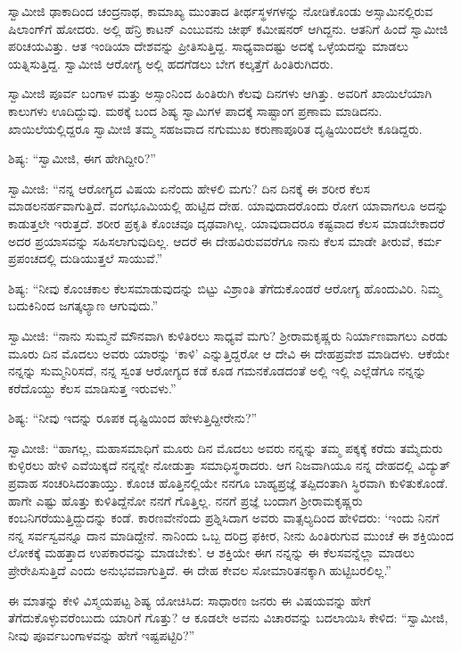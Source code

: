  ಸ್ವಾಮೀಜಿ ಢಾಕಾದಿಂದ ಚಂದ್ರನಾಥ, ಕಾಮಾಖ್ಯ ಮುಂತಾದ ತೀರ್ಥಸ್ಥಳಗಳನ್ನು ನೋಡಿಕೊಂಡು ಅಸ್ಸಾಮಿನಲ್ಲಿರುವ ಷಿಲಾಂಗ್‍ಗೆ ಹೋದರು. ಅಲ್ಲಿ ಹೆನ್ರಿ ಕಾಟನ್ ಎಂಬುವನು ಚೀಫ್ ಕಮೀಷನರ್ ಆಗಿದ್ದನು. ಆತನಿಗೆ ಹಿಂದೆ ಸ್ವಾಮೀಜಿ ಪರಿಚಯವಿತ್ತು. ಆತ ಇಂಡಿಯಾ ದೇಶವನ್ನು ಪ್ರೀತಿಸುತ್ತಿದ್ದ. ಸಾಧ್ಯವಾದಷ್ಟು ಅದಕ್ಕೆ ಒಳ್ಳೆಯದನ್ನು ಮಾಡಲು ಯತ್ನಿಸುತ್ತಿದ್ದ. ಸ್ವಾಮೀಜಿ ಆರೋಗ್ಯ ಅಲ್ಲಿ ಹದಗೆಡಲು ಬೇಗ ಕಲ್ಕತ್ತೆಗೆ ಹಿಂತಿರುಗಿದರು. 

 ಸ್ವಾಮೀಜಿ ಪೂರ್ವ ಬಂಗಾಳ ಮತ್ತು ಅಸ್ಸಾಂನಿಂದ ಹಿಂತಿರುಗಿ ಕೆಲವು ದಿನಗಳು ಆಗಿತ್ತು. ಅವರಿಗೆ ಖಾಯಿಲೆಯಾಗಿ ಕಾಲುಗಳು ಊದಿದ್ದುವು. ಮಠಕ್ಕೆ ಬಂದ ಶಿಷ್ಯ ಸ್ವಾಮಿಗಳ ಪಾದಕ್ಕೆ ಸಾಷ್ಟಾಂಗ ಪ್ರಣಾಮ ಮಾಡಿದನು. ಖಾಯಿಲೆಯಲ್ಲಿದ್ದರೂ ಸ್ವಾಮೀಜಿ ತಮ್ಮ ಸಹಜವಾದ ನಗುಮುಖ ಕರುಣಾಪೂರಿತ ದೃಷ್ಟಿಯಿಂದಲೇ ಕೂಡಿದ್ದರು. 

 ಶಿಷ್ಯ: “ಸ್ವಾಮೀಜಿ, ಈಗ ಹೇಗಿದ್ದೀರಿ?” 

 ಸ್ವಾಮೀಜಿ: “ನನ್ನ ಆರೋಗ್ಯದ ವಿಷಯ ಏನೆಂದು ಹೇಳಲಿ ಮಗು? ದಿನ ದಿನಕ್ಕೆ ಈ ಶರೀರ ಕೆಲಸ ಮಾಡಲನರ್ಹವಾಗುತ್ತಿದೆ. ವಂಗಭೂಮಿಯಲ್ಲಿ ಹುಟ್ಟಿದ ದೇಹ. ಯಾವುದಾದರೊಂದು ರೋಗ ಯಾವಾಗಲೂ ಅದನ್ನು ಕಾಡುತ್ತಲೇ ಇರುತ್ತದೆ. ಶರೀರ ಪ್ರಕೃತಿ ಕೊಂಚವೂ ದೃಢವಾಗಿಲ್ಲ. ಯಾವುದಾದರೂ ಕಷ್ಟವಾದ ಕೆಲಸ ಮಾಡಬೇಕಾದರೆ ಅದರ ಪ್ರಯಾಸವನ್ನು ಸಹಿಸಲಾಗುವುದಿಲ್ಲ. ಆದರೆ ಈ ದೇಹವಿರುವವರೆಗೂ ನಾನು ಕೆಲಸ ಮಾಡೇ ತೀರುವೆ, ಕರ್ಮ ಪ್ರಪಂಚದಲ್ಲಿ ದುಡಿಯುತ್ತಲೆ ಸಾಯುವೆ.” 

 ಶಿಷ್ಯ: “ನೀವು ಕೊಂಚಕಾಲ ಕೆಲಸಮಾಡುವುದನ್ನು ಬಿಟ್ಟು ವಿಶ್ರಾಂತಿ ತೆಗೆದುಕೊಂಡರೆ ಆರೋಗ್ಯ ಹೊಂದುವಿರಿ. ನಿಮ್ಮ ಬದುಕಿನಿಂದ ಜಗತ್ಕಲ್ಯಾಣ ಆಗುವುದು.” 

 ಸ್ವಾಮೀಜಿ: “ನಾನು ಸುಮ್ಮನೆ ಮೌನವಾಗಿ ಕುಳಿತಿರಲು ಸಾಧ್ಯವೆ ಮಗು? ಶ‍್ರೀರಾಮಕೃಷ್ಣರು ನಿರ್ಯಾಣವಾಗಲು ಎರಡು ಮೂರು ದಿನ ಮೊದಲು ಅವರು ಯಾರನ್ನು ‘ಕಾಳಿ’ ಎನ್ನುತ್ತಿದ್ದರೋ ಆ ದೇವಿ ಈ ದೇಹಪ್ರವೇಶ ಮಾಡಿದಳು. ಆಕೆಯೇ ನನ್ನನ್ನು ಸುಮ್ಮನಿರಿಸದೆ, ನನ್ನ ಸ್ವಂತ ಆರೋಗ್ಯದ ಕಡೆ ಕೂಡ ಗಮನಕೊಡದಂತೆ ಅಲ್ಲಿ ಇಲ್ಲಿ ಎಲ್ಲೆಡೆಗೂ ನನ್ನನ್ನು ಕರೆದೊಯ್ದು ಕೆಲಸ ಮಾಡಿಸುತ್ತ ಇರುವಳು.” 

 ಶಿಷ್ಯ: “ನೀವು ಇದನ್ನು ರೂಪಕ ದೃಷ್ಟಿಯಿಂದ ಹೇಳುತ್ತಿದ್ದೀರೇನು?” 

 ಸ್ವಾಮೀಜಿ: “ಹಾಗಲ್ಲ, ಮಹಾಸಮಾಧಿಗೆ ಮೂರು ದಿನ ಮೊದಲು ಅವರು ನನ್ನನ್ನು ತಮ್ಮ ಪಕ್ಕಕ್ಕೆ ಕರೆದು ತಮ್ಮೆದುರು ಕುಳ್ಳಿರಲು ಹೇಳಿ ಎವೆಯಿಕ್ಕದೆ ನನ್ನನ್ನೇ ನೋಡುತ್ತಾ ಸಮಾಧಿಸ್ಥರಾದರು. ಆಗ ನಿಜವಾಗಿಯೂ ನನ್ನ ದೇಹದಲ್ಲಿ ವಿದ್ಯುತ್ ಪ್ರವಾಹ ಸಂಚರಿಸಿದಂತಾಯ್ತು. ಕೊಂಚ ಹೊತ್ತಿನಲ್ಲಿಯೇ ನನಗೂ ಬಾಹ್ಯಪ್ರಜ್ಞೆ ತಪ್ಪಿದಂತಾಗಿ ಸ್ಥಿರವಾಗಿ ಕುಳಿತುಕೊಂಡೆ. ಹಾಗೇ ಎಷ್ಟು ಹೊತ್ತು ಕುಳಿತಿದ್ದೆನೋ ನನಗೆ ಗೊತ್ತಿಲ್ಲ. ನನಗೆ ಪ್ರಜ್ಞೆ ಬಂದಾಗ ಶ‍್ರೀರಾಮಕೃಷ್ಣರು ಕಂಬನಿಗರೆಯುತ್ತಿದ್ದುದನ್ನು ಕಂಡೆ. ಕಾರಣವೇನೆಂದು ಪ್ರಶ್ನಿಸಿದಾಗ ಅವರು ವಾತ್ಸಲ್ಯದಿಂದ ಹೇಳಿದರು: ‘ಇಂದು ನಿನಗೆ ನನ್ನ ಸರ್ವಸ್ವವನ್ನೂ ದಾನ ಮಾಡಿದ್ದೇನೆ. ನಾನಿಂದು ಒಬ್ಬ ದರಿದ್ರ ಫಕೀರ, ನೀನು ಹಿಂತಿರುಗುವ ಮುಂಚೆ ಈ ಶಕ್ತಿಯಿಂದ ಲೋಕಕ್ಕೆ ಮಹತ್ತಾದ ಉಪಕಾರವನ್ನು ಮಾಡಬೇಕು’. ಆ ಶಕ್ತಿಯೇ ಈಗ ನನ್ನನ್ನು ಈ ಕೆಲಸವನ್ನೆಲ್ಲಾ ಮಾಡಲು ಪ್ರೇರೇಪಿಸುತ್ತಿದೆ ಎಂದು ಅನುಭವವಾಗುತ್ತಿದೆ. ಈ ದೇಹ ಕೇವಲ ಸೋಮಾರಿತನಕ್ಕಾಗಿ ಹುಟ್ಟಿಬರಲಿಲ್ಲ.” 

 ಈ ಮಾತನ್ನು ಕೇಳಿ ವಿಸ್ಮಯಪಟ್ಟ ಶಿಷ್ಯ ಯೋಚಿಸಿದ: ಸಾಧಾರಣ ಜನರು ಈ ವಿಷಯವನ್ನು ಹೇಗೆ ತೆಗೆದುಕೊಳ್ಳುವರೆಂಬುದು ಯಾರಿಗೆ ಗೊತ್ತು? ಆ ಕೂಡಲೇ ಅವನು ವಿಚಾರವನ್ನು ಬದಲಾಯಿಸಿ ಕೇಳಿದ: “ಸ್ವಾಮೀಜಿ, ನೀವು ಪೂರ್ವಬಂಗಾಳವನ್ನು ಹೇಗೆ ಇಷ್ಟಪಟ್ಟಿರಿ?” 

